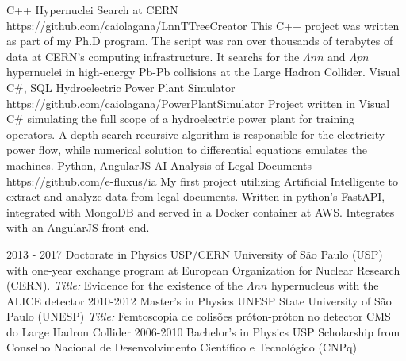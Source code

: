 \documentclass[9pt]{developercv} %
\begin{document}

\vspace{10 pt}
\begin{entrylist}
	\entry
		{C++}
		{Hypernuclei Search at CERN}
		{https://github.com/caiolagana/LnnTTreeCreator}
		{This C++ project was written as part of my Ph.D program. The script was ran over thousands of terabytes of data at CERN's computing infrastructure. It searchs for the $\Lambda nn$ and $\Lambda pn$ hypernuclei in high-energy Pb-Pb collisions at the Large Hadron Collider.}
    \entry
		{Visual C\#, SQL}
		{Hydroelectric Power Plant Simulator}
		{https://github.com/caiolagana/PowerPlantSimulator}
		{Project written in Visual C\# simulating the full scope of a hydroelectric power plant for training operators. A depth-search recursive algorithm is responsible for the electricity power flow, while numerical solution to differential equations emulates the machines.}
    \entry
		{Python, AngularJS}
		{AI Analysis of Legal Documents}
		{https://github.com/e-fluxus/ia}
		{My first project utilizing Artificial Intelligente to extract and analyze data from legal documents. Written in python's FastAPI, integrated with MongoDB and served in a Docker container at AWS. Integrates with an AngularJS front-end.}
\end{entrylist}


\vspace{-10 pt}
\begin{entrylist}
    \entry
		{2013 - 2017}
		{Doctorate in Physics}
		{USP/CERN}
		{University of São Paulo (USP) with one-year exchange program at European Organization for Nuclear Research (CERN). {\it Title:} Evidence for the existence of the $\Lambda nn$ hypernucleus with the ALICE detector}
    \entry
		{2010-2012}
		{Master's in Physics}
		{UNESP}
		{State University of São Paulo (UNESP) {\it Title:} Femtoscopia de colisões próton-próton no detector CMS do Large Hadron Collider}
	\entry
		{2006-2010}
		{Bachelor's in Physics}
		{USP}
		{Scholarship from Conselho Nacional de Desenvolvimento Científico e Tecnológico (CNPq)}
\end{entrylist}
\end{document}
